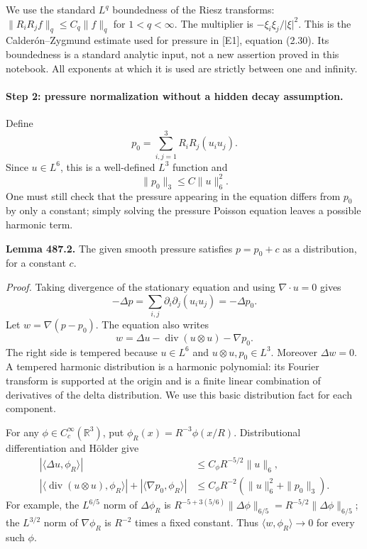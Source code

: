 \documentclass[11pt]{article}
\begin{document}
We use the standard $L^q$ boundedness of the Riesz transforms:
$\|R_iR_j f\|_q\leq C_q\|f\|_q$ for $1<q<\infty$.
The multiplier is $-\xi_i\xi_j/|\xi|^2$. This is the
Calder\'on--Zygmund estimate used for pressure in [E1], equation (2.30).
Its boundedness is a standard analytic input, not a new assertion proved
in this notebook. All exponents at which it is used are strictly between
one and infinity.

\paragraph{Step 2: pressure normalization without a hidden decay assumption.}
Define
\begin{equation}\label{ra487:pressure}
 p_0=\sum_{i,j=1}^3R_iR_j(u_i u_j).
\end{equation}
Since $u\in L^6$, this is a well-defined $L^3$ function and
\[
 \|p_0\|_3\leq C\|u\|_6^2.
\]
One must still check that the pressure appearing in the equation differs
from $p_0$ by only a constant; simply solving the pressure Poisson
equation leaves a possible harmonic term.

\textbf{Lemma 487.2.} The given smooth pressure satisfies $p=p_0+c$
as a distribution, for a constant $c$.

\emph{Proof.}
Taking divergence of the stationary equation and using
$\nabla\cdot u=0$ gives
\[
 -\Delta p=\sum_{i,j}\partial_i\partial_j(u_i u_j)
                         =-\Delta p_0.
\]
Let $w=\nabla(p-p_0)$. The equation also writes
\[
 w=\Delta u-\operatorname{div}(u\otimes u)-\nabla p_0.
\]
The right side is tempered because $u\in L^6$ and $u\otimes u,p_0\in
L^3$. Moreover $\Delta w=0$. A tempered harmonic distribution is a
harmonic polynomial: its Fourier transform is supported at the origin
and is a finite linear combination of derivatives of the delta
distribution. We use this basic distribution fact for each component.

For any $\phi\in C_c^\infty(\mathbb R^3)$, put
$\phi_R(x)=R^{-3}\phi(x/R)$. Distributional differentiation and H\"older
give
\begin{align*}
 |\langle\Delta u,\phi_R\rangle|
 &\leq C_\phi R^{-5/2}\|u\|_6,\\
 |\langle\operatorname{div}(u\otimes u),\phi_R\rangle|
   +|\langle\nabla p_0,\phi_R\rangle|
 &\leq C_\phi R^{-2}(\|u\|_6^2+\|p_0\|_3).
\end{align*}
For example, the $L^{6/5}$ norm of $\Delta\phi_R$ is
$R^{-5+3(5/6)}\|\Delta\phi\|_{6/5}=R^{-5/2}\|\Delta\phi\|_{6/5}$;
the $L^{3/2}$ norm of $\nabla\phi_R$ is $R^{-2}$ times a fixed
constant. Thus $\langle w,\phi_R\rangle\to0$ for every such $\phi$.
\end{document}
